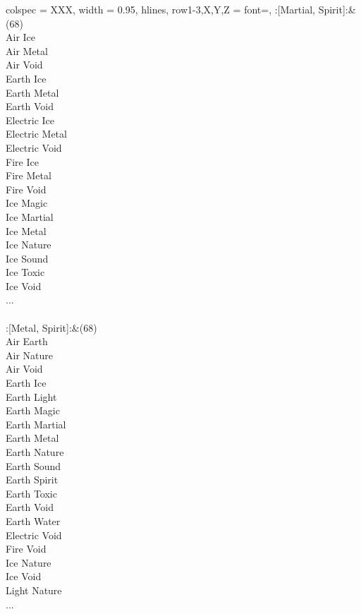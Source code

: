 \begin{longtblr}[
	caption = {2v2 Attacking Effective},
	label = {2v2-Attacking-Effective},
]{
	colspec = {XXX}, width = 0.95\linewidth,
	hlines,
	row{1-3,X,Y,Z} = {font=\bfseries},
}
	:[Martial, Spirit]:&{(68)\\
	Air Ice \\
	Air Metal \\
	Air Void \\
	Earth Ice \\
	Earth Metal \\
	Earth Void \\
	Electric Ice \\
	Electric Metal \\
	Electric Void \\
	Fire Ice \\
	Fire Metal \\
	Fire Void \\
	Ice Magic \\
	Ice Martial \\
	Ice Metal \\
	Ice Nature \\
	Ice Sound \\
	Ice Toxic \\
	Ice Void \\
	...\\
	}\\

	:[Metal, Spirit]:&{(68)\\
	Air Earth \\
	Air Nature \\
	Air Void \\
	Earth Ice \\
	Earth Light \\
	Earth Magic \\
	Earth Martial \\
	Earth Metal \\
	Earth Nature \\
	Earth Sound \\
	Earth Spirit \\
	Earth Toxic \\
	Earth Void \\
	Earth Water \\
	Electric Void \\
	Fire Void \\
	Ice Nature \\
	Ice Void \\
	Light Nature \\
	...\\
	}\\


\end{longtblr}
